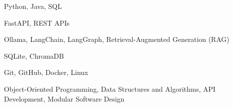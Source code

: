 
{Python, Java, SQL}

{FastAPI, REST APIs}

{Ollama, LangChain, LangGraph, Retrieval-Augmented Generation (RAG)}

{SQLite, ChromaDB}

{Git, GitHub, Docker, Linux}

{Object-Oriented Programming, Data Structures and Algorithms, API Development, Modular Software Design}